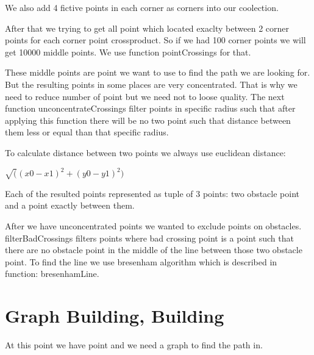 \documentclass[12pt]{article}
\begin{document}
We also add 4 fictive points in each corner as corners into our coolection. 

After that we trying to get all point which located exaclty between 2 corner points for each corner point crossproduct. So if we had 100 corner points we will get 10000 middle points. We use function pointCrossings for that.

These middle points are point we want to use to find the path we are looking for. But the resulting points in some places are very concentrated. That is why we need to reduce number of point but we need not to loose quality. The next function unconcentrateCrossings filter points in specific radius such that after applying this function there will be no two point such that distance between them less or equal than that specific radius.

To calculate distance between two points we always use euclidean distance: 

    $\sqrt((x0-x1)^2 + (y0-y1)^2)$

Each of the resulted points represented as tuple of 3 points: two obstacle point and a point exactly between them.

After we have unconcentrated points we wanted to exclude points on obstacles. filterBadCrossings filters points where bad crossing point is a point such that there are no obstacle point in the middle of the line between those two obstacle point. To find the line we use bresenham algorithm which is described in function: bresenhamLine.

\section{Graph Building, Building}

At this point we have point and we need a graph to find the path in.




\end{document}
